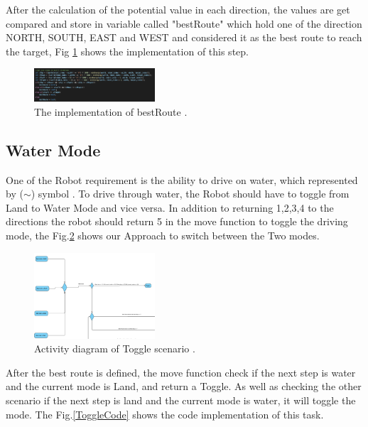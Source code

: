 \documentclass[conference]{IEEEtran}
\begin{document}
After the calculation  of the potential value in each direction, the values are get compared  and store in variable called "bestRoute" which hold one of the direction NORTH, SOUTH, EAST and WEST and considered it as the best route to reach the target, Fig \ref{MinstepsCode} shows the implementation of this step. 


\begin{figure}[!h]
	
	\centering
	\includegraphics[width=0.4\textwidth]{minStepsCode.png}
	\caption{\label{MinstepsCode}The implementation of bestRoute  .}
	
\end{figure}



\subsection{Water Mode }


One of the Robot requirement is the ability to drive on water, which represented by  ($\sim$) symbol . To drive through water, the Robot should have to  toggle from Land to Water Mode and vice versa.  In addition to returning  1,2,3,4 to the directions  the robot should return 5 in the
move function to toggle the driving mode, the Fig.\ref{ToggleAct} shows our Approach to switch between the Two modes. 


\begin{figure}[!h]
	
	\centering
	\includegraphics[width=0.4\textwidth]{Toggle.png}
	\caption{\label{ToggleAct}Activity diagram of Toggle scenario  .}
	
\end{figure}


After the best route is defined, the move function check if the next step is water and the current mode is Land, and return a Toggle. As well as checking the other scenario if the next step is land and the current mode is water, it will toggle the mode. The Fig.\ref{ToggleCode} shows the code implementation of this task.
\end{document}
